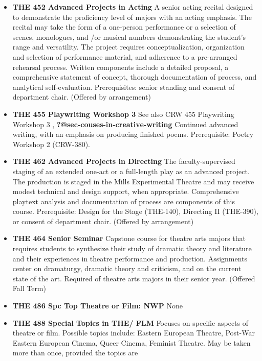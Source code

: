 \documentclass[
  letterpaper,
]{scrbook}
\begin{document}
\begin{itemize}
\item
  \textbf{THE 452 Advanced Projects in Acting} A senior acting recital
  designed to demonstrate the proficiency level of majors with an acting
  emphasis. The recital may take the form of a one-person performance or
  a selection of scenes, monologues, and /or musical numbers
  demonstrating the student's range and versatility. The project
  requires conceptualization, organization and selection of performance
  material, and adherence to a pre-arranged rehearsal process. Written
  components include a detailed proposal, a comprehensive statement of
  concept, thorough documentation of process, and analytical
  self-evaluation. Prerequisites: senior standing and consent of
  department chair. (Offered by arrangement)\\
\item
  \textbf{THE 455 Playwriting Workshop 3} See also CRW 455 Playwriting
  Workshop 3 , \textbf{?@sec-couses-in-creative-writing} Continued
  advanced writing, with an emphasis on producing finished poems.
  Prerequisite: Poetry Workshop 2 (CRW-380).
\item
  \textbf{THE 462 Advanced Projects in Directing} The faculty-supervised
  staging of an extended one-act or a full-length play as an advanced
  project. The production is staged in the Mills Experimental Theatre
  and may receive modest technical and design support, when appropriate.
  Comprehensive playtext analysis and documentation of process are
  components of this course. Prerequisite: Design for the Stage
  (THE-140), Directing II (THE-390), or consent of department chair.
  (Offered by arrangement)\\
\item
  \textbf{THE 464 Senior Seminar} Capstone course for theatre arts
  majors that requires students to synthesize their study of dramatic
  theory and literature and their experiences in theatre performance and
  production. Assignments center on dramaturgy, dramatic theory and
  criticism, and on the current state of the art. Required of theatre
  arts majors in their senior year. (Offered Fall Term)
\item
  \textbf{THE 486 Spc Top Theatre or Film: NWP} None\\
\item
  \textbf{THE 488 Special Topics in THE/ FLM} Focuses on specific
  aspects of theatre or film. Possible topics include: Eastern European
  Theatre, Post-War Eastern European Cinema, Queer Cinema, Feminist
  Theatre. May be taken more than once, provided the topics are

\end{itemize}
\end{document}
